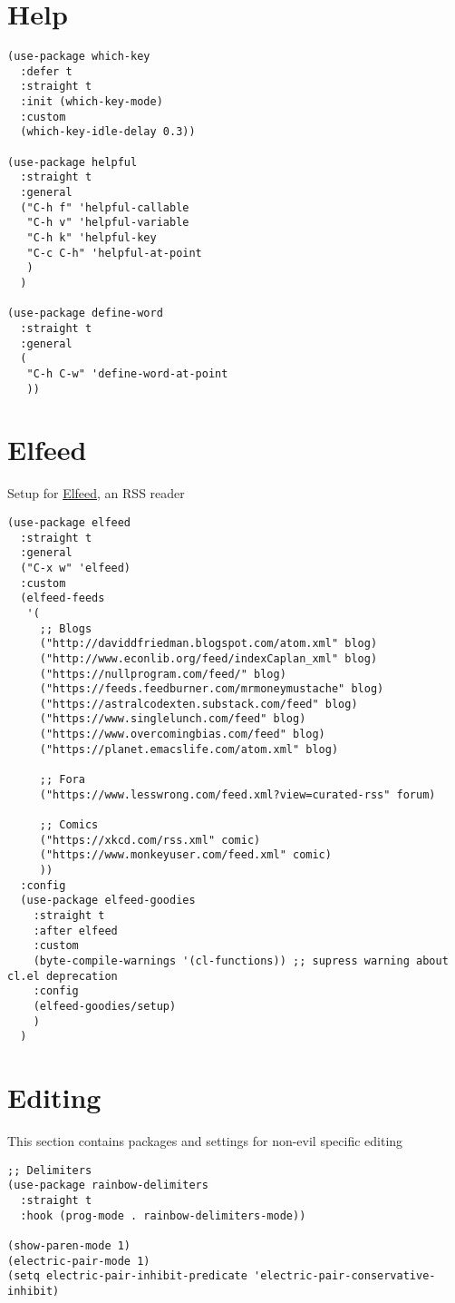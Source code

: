 \documentclass[11pt]{article}
\begin{document}
\section{Help}
\label{sec:orgfa613eb}
\begin{verbatim}
(use-package which-key
  :defer t
  :straight t
  :init (which-key-mode)
  :custom
  (which-key-idle-delay 0.3))

(use-package helpful
  :straight t
  :general
  ("C-h f" 'helpful-callable
   "C-h v" 'helpful-variable
   "C-h k" 'helpful-key
   "C-c C-h" 'helpful-at-point
   )
  )

(use-package define-word
  :straight t
  :general
  (
   "C-h C-w" 'define-word-at-point
   ))
\end{verbatim}

\section{Elfeed}
\label{sec:org26fcdbd}
Setup for \href{https://github.com/skeeto/elfeed}{Elfeed}, an RSS reader
\begin{verbatim}
(use-package elfeed
  :straight t
  :general
  ("C-x w" 'elfeed)
  :custom 
  (elfeed-feeds
   '(
     ;; Blogs
     ("http://daviddfriedman.blogspot.com/atom.xml" blog)
     ("http://www.econlib.org/feed/indexCaplan_xml" blog)
     ("https://nullprogram.com/feed/" blog)
     ("https://feeds.feedburner.com/mrmoneymustache" blog)
     ("https://astralcodexten.substack.com/feed" blog)
     ("https://www.singlelunch.com/feed" blog)
     ("https://www.overcomingbias.com/feed" blog)
     ("https://planet.emacslife.com/atom.xml" blog)

     ;; Fora
     ("https://www.lesswrong.com/feed.xml?view=curated-rss" forum)

     ;; Comics
     ("https://xkcd.com/rss.xml" comic)
     ("https://www.monkeyuser.com/feed.xml" comic)
     ))
  :config
  (use-package elfeed-goodies
    :straight t
    :after elfeed
    :custom
    (byte-compile-warnings '(cl-functions)) ;; supress warning about cl.el deprecation
    :config
    (elfeed-goodies/setup)
    )
  )
\end{verbatim}

\section{Editing}
\label{sec:orgcdef8a9}
This section contains packages and settings for
non-evil specific editing
\begin{verbatim}
;; Delimiters
(use-package rainbow-delimiters
  :straight t
  :hook (prog-mode . rainbow-delimiters-mode))

(show-paren-mode 1)
(electric-pair-mode 1)
(setq electric-pair-inhibit-predicate 'electric-pair-conservative-inhibit)
\end{verbatim}
\end{document}
